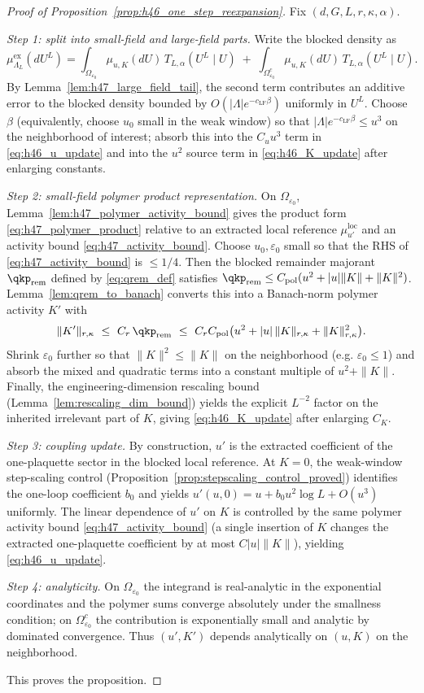 \begin{proof}[Proof of Proposition~\ref{prop:h46_one_step_reexpansion}]
Fix $(d,G,L,r,\kappa,\alpha)$.

\emph{Step 1: split into small-field and large-field parts.}
Write the blocked density as
\[
\mu^{\mathrm{ex}}_{\Lambda_L}(dU^L)
=\int_{\Omega_{\varepsilon_0}} \mu_{u,K}(dU)\,T_{L,\alpha}(U^L\mid U)
\;+\;
\int_{\Omega_{\varepsilon_0}^c} \mu_{u,K}(dU)\,T_{L,\alpha}(U^L\mid U).
\]
By Lemma~\ref{lem:h47_large_field_tail}, the second term contributes an additive error to the blocked density bounded by
$O(|\Lambda|e^{-c_{\mathrm{LF}}\beta})$ uniformly in $U^L$.
Choose $\beta$ (equivalently, choose $u_0$ small in the weak window) so that $|\Lambda|e^{-c_{\mathrm{LF}}\beta}\le u^3$
on the neighborhood of interest; absorb this into the $C_u u^3$ term in \eqref{eq:h46_u_update} and into the $u^2$ source term
in \eqref{eq:h46_K_update} after enlarging constants.

\emph{Step 2: small-field polymer product representation.}
On $\Omega_{\varepsilon_0}$, Lemma~\ref{lem:h47_polymer_activity_bound} gives the product form \eqref{eq:h47_polymer_product}
relative to an extracted local reference $\mu^{\mathrm{loc}}_{u'}$ and an activity bound \eqref{eq:h47_activity_bound}.
Choose $u_0,\varepsilon_0$ small so that the RHS of \eqref{eq:h47_activity_bound} is $\le 1/4$.
Then the blocked remainder majorant $\qkp_{\mathrm{rem}}$ defined by \eqref{eq:qrem_def} satisfies
$\qkp_{\mathrm{rem}}\le C_{\mathrm{pol}}(u^2+|u|\|K\|+\|K\|^2)$.
Lemma~\ref{lem:qrem_to_banach} converts this into a Banach-norm polymer activity $K'$ with
\[
\|K'\|_{r,\kappa}\ \le\ C_r\,\qkp_{\mathrm{rem}}
\ \le\ C_r C_{\mathrm{pol}}\bigl(u^2+|u|\,\|K\|_{r,\kappa}+\|K\|_{r,\kappa}^2\bigr).
\]
Shrink $\varepsilon_0$ further so that $\|K\|^2\le \|K\|$ on the neighborhood (e.g. $\varepsilon_0\le 1$) and absorb the mixed and quadratic
terms into a constant multiple of $u^2+ \|K\|$.
Finally, the engineering-dimension rescaling bound (Lemma~\ref{lem:rescaling_dim_bound}) yields the explicit $L^{-2}$ factor on the inherited
irrelevant part of $K$, giving \eqref{eq:h46_K_update} after enlarging $C_K$.

\emph{Step 3: coupling update.}
By construction, $u'$ is the extracted coefficient of the one-plaquette sector in the blocked local reference.
At $K=0$, the weak-window step-scaling control (Proposition~\ref{prop:stepscaling_control_proved}) identifies the one-loop coefficient
$b_0$ and yields
$u'(u,0)=u+b_0u^2\log L+O(u^3)$ uniformly.
The linear dependence of $u'$ on $K$ is controlled by the same polymer activity bound \eqref{eq:h47_activity_bound} (a single insertion of
$K$ changes the extracted one-plaquette coefficient by at most $C|u|\|K\|$), yielding \eqref{eq:h46_u_update}.

\emph{Step 4: analyticity.}
On $\Omega_{\varepsilon_0}$ the integrand is real-analytic in the exponential coordinates and the polymer sums converge absolutely under
the smallness condition; on $\Omega_{\varepsilon_0}^c$ the contribution is exponentially small and analytic by dominated convergence.
Thus $(u',K')$ depends analytically on $(u,K)$ on the neighborhood.

This proves the proposition.
\end{proof}


